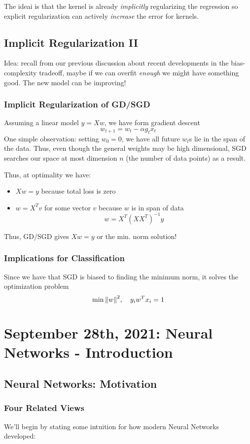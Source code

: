 \documentclass[11pt]{scrartcl}
\begin{document}
The ideai is that the kernel is already \textit{implicitly} regularizing the regression so explicit regularization can actively \textit{increase} the error for kernels.

\subsection{Implicit Regularization II}
Idea: recall from our previous discussion about recent developments in the bias-complexity tradeoff, maybe if we can overfit \textit{enough} we might have something good. The new model can be improving!
\subsubsection{Implicit Regularization of GD/SGD}
Assuming a linear model $y=Xw$, we have form gradient descent $$w_{t+1}=w_{t}-\alpha g_{t} x_{t}$$ 
One simple observation: setting $w_0=0$, we have all future $w_{t}$s lie in the span of the data. Thus, even though the general weights may be high dimensional, SGD searches our space at most dimension $n$ (the number of data points) as a result.

Thus, at optimality we have:
\begin{itemize}
    \item $Xw=y$ because total loss is zero 
    \item $w=X^{T}v$ for some vector $v$ because $w$ is in span of data $$w=X^{T}(XX^{T})^{-1}y$$
\end{itemize}
Thus, GD/SGD gives $Xw=y$ or the min. norm solution!

\subsubsection{Implications for Classification}
Since we have that SGD is biased to finding the minimum norm, it solves the optimization problem $$\min{\left\lVert w\right\rVert^2}, \quad y_i w^{T}x_i=1$$
\newpage

\section{September 28th, 2021: Neural Networks - Introduction}
\subsection{Neural Networks: Motivation}
\subsubsection{Four Related Views}
We'll begin by stating some intuition for how modern Neural Networks developed:
\end{document}
